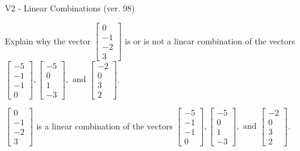\begin{exercise}
  \begin{exerciseTitle}V2 - Linear Combinations (ver. 98)\end{exerciseTitle}
  \begin{exerciseStatement}
    Explain why the vector \(\left[\begin{array}{c}
0 \\
-1 \\
-2 \\
3
\end{array}\right]\)  is or is not a linear 
	combination of the vectors \(\left[\begin{array}{c}
-5 \\
-1 \\
-1 \\
0
\end{array}\right] , \left[\begin{array}{c}
-5 \\
0 \\
1 \\
-3
\end{array}\right] , \text{ and } \left[\begin{array}{c}
-2 \\
0 \\
3 \\
2
\end{array}\right]\).
	


  \end{exerciseStatement}
  \begin{exerciseAnswer}
   \(\left[\begin{array}{c}
0 \\
-1 \\
-2 \\
3
\end{array}\right]\) 
  	 is  
	a linear combination of the vectors \(\left[\begin{array}{c}
-5 \\
-1 \\
-1 \\
0
\end{array}\right] , \left[\begin{array}{c}
-5 \\
0 \\
1 \\
-3
\end{array}\right] , \text{ and } \left[\begin{array}{c}
-2 \\
0 \\
3 \\
2
\end{array}\right]\).

	
  


  \end{exerciseAnswer}
\end{exercise}